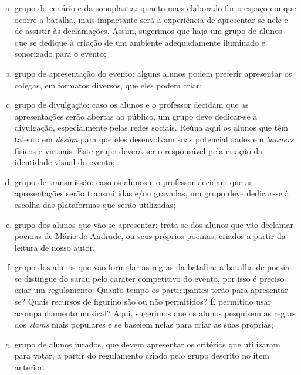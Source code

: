 \documentclass[11pt]{extarticle}
\begin{document}
\begin{enumerate}[(a)]  

\item grupo do cenário e da sonoplastia: quanto mais elaborado for o espaço
em que ocorre a batalha, mais impactante será a experiência de
apresentar-se nele e de assistir às declamações. Assim, sugerimos que
haja um grupo de alunos que se dedique à criação de um ambiente
adequadamente iluminado e sonorizado para o evento;

\item grupo de apresentação do evento: alguns alunos podem preferir
apresentar os colegas, em formatos diversos, que eles podem criar;

\item grupo de divulgação: caso os alunos e o professor decidam que as
apresentações serão abertas ao público, um grupo deve dedicar-se à
divulgação, especialmente pelas redes sociais. Reúna aqui os alunos que
têm talento em \emph{design} para que eles desenvolvam suas
potencialidades em \emph{banners} físicos e virtuais. Este grupo deverá
ser o responsável pela criação da identidade visual do evento;

\item grupo de transmissão: caso os alunos e o professor decidam que as
apresentações serão transmitidas e/ou gravadas, um grupo deve dedicar-se
à escolha das plataformas que serão utilizadas;

\item grupo dos alunos que vão se apresentar: trata-se dos alunos que vão
declamar poemas de Mário de Andrade, ou seus próprios poemas, criados a
partir da leitura de nosso autor.

\item grupo dos alunos que vão formular as regras da batalha: a batalha de
poesia se distingue do sarau pelo caráter competitivo do evento, por
isso é preciso criar um regulamento: Quanto tempo os participantes terão
para apresentar-se? Quais recursos de figurino são ou não permitidos? É
permitido usar acompanhamento musical? Aqui, sugerimos que os alunos
pesquisem as regras dos \emph{slams} mais populares e se baseiem nelas
para criar as suas próprias;

\item grupo de alunos jurados, que devem apresentar os critérios que
utilizaram para votar, a partir do regulamento criado pelo grupo
descrito no item anterior.



\end{enumerate}
\end{document}
